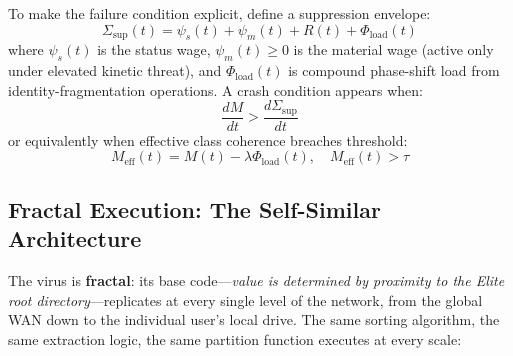 \documentclass[12pt,openany]{book}
\begin{document}
To make the failure condition explicit, define a suppression envelope:
\[
\Sigma_{\text{sup}}(t) = \psi_s(t) + \psi_m(t) + R(t) + \Phi_{\text{load}}(t)
\]
where $\psi_s(t)$ is the status wage, $\psi_m(t) \geq 0$ is the material wage (active only under elevated kinetic threat), and $\Phi_{\text{load}}(t)$ is compound phase-shift load from identity-fragmentation operations. A crash condition appears when:
\[
\frac{dM}{dt} > \frac{d\Sigma_{\text{sup}}}{dt}
\]
or equivalently when effective class coherence breaches threshold:
\[
M_{\text{eff}}(t) = M(t) - \lambda \Phi_{\text{load}}(t), \quad M_{\text{eff}}(t) > \tau
\]

\subsection{Fractal Execution: The Self-Similar Architecture}

The virus is \textbf{fractal}: its base code---\textit{value is determined by proximity to the Elite root directory}---replicates at every single level of the network, from the global WAN down to the individual user's local drive. The same sorting algorithm, the same extraction logic, the same partition function executes at every scale:
\end{document}
